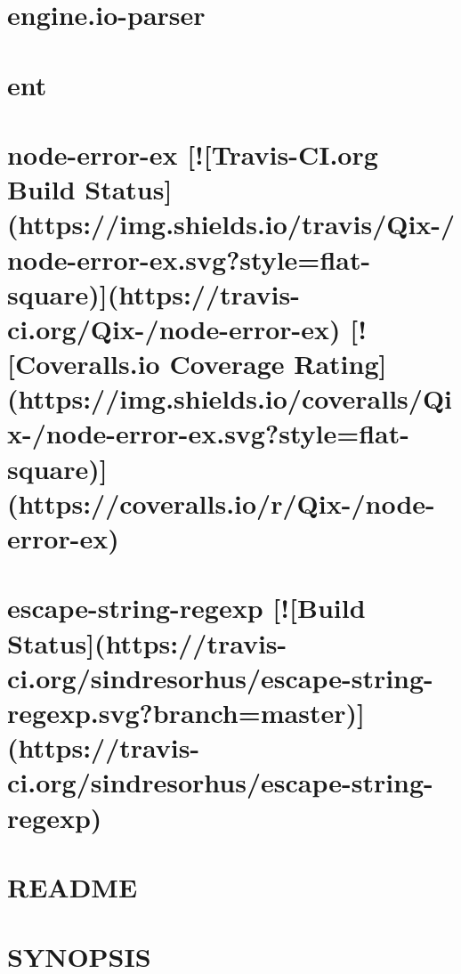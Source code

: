 \documentclass[twoside]{book}
\newcommand{\+}{\discretionary{\mbox{\scriptsize$\hookleftarrow$}}{}{}}
\begin{document}
\chapter{engine.\+io-\/parser}
\label{md_app_web_node_modules_engine_8io-parser__readme}

\chapter{ent}
\label{md_app_web_node_modules_ent_readme}

\chapter{node-\/error-\/ex \mbox{[}!\mbox{[}Travis-\/\+CI.org Build Status\mbox{]}(https\+://img.shields.\+io/travis/\+Qix-\//node-\/error-\/ex.svg?style=flat-\/square)\mbox{]}(https\+://travis-\/ci.org/\+Qix-\//node-\/error-\/ex) \mbox{[}!\mbox{[}Coveralls.\+io Coverage Rating\mbox{]}(https\+://img.shields.\+io/coveralls/\+Qix-\//node-\/error-\/ex.svg?style=flat-\/square)\mbox{]}(https\+://coveralls.io/r/\+Qix-\//node-\/error-\/ex)}
\label{md_app_web_node_modules_error-ex__r_e_a_d_m_e}

\chapter{escape-\/string-\/regexp \mbox{[}!\mbox{[}Build Status\mbox{]}(https\+://travis-\/ci.org/sindresorhus/escape-\/string-\/regexp.svg?branch=master)\mbox{]}(https\+://travis-\/ci.org/sindresorhus/escape-\/string-\/regexp)}
\label{md_app_web_node_modules_escape-string-regexp_readme}

\chapter{R\+E\+A\+D\+ME}
\label{md_app_web_node_modules_esprima__r_e_a_d_m_e}

\chapter{S\+Y\+N\+O\+P\+S\+IS}
\label{md_app_web_node_modules_ethereumjs-util__r_e_a_d_m_e}

\end{document}
